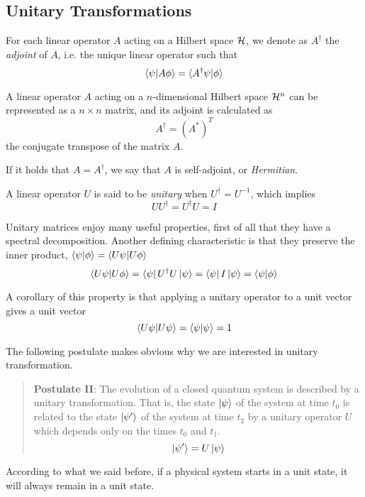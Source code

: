 \subsection{Unitary Transformations}

For each linear operator $A$ acting on a Hilbert space $\mathcal{H}$, we denote as $A^\dagger$ the \textit{adjoint} of $A$, i.e. the unique linear operator such that
\[
	\braket{\psi|A\phi} = \braket{A^\dagger\psi|\phi}
\]

A linear operator $A$ acting on a $n$-dimensional Hilbert space $\mathcal{H}^n$ can be represented as a $n\times n$ matrix, and its adjoint is calculated as 
\[
	A^\dagger = (A^*)^T
\] the conjugate transpose of the matrix $A$.


If it holds that $A = A^\dagger$, we say that $A$ is self-adjoint, or \textit{Hermitian}.

A linear operator $U$ is said to be \textit{unitary} when $U^\dagger = U^{-1}$, which implies 
\[
	UU^\dagger = U^\dagger U = I
\]

Unitary matrices enjoy many useful properties, first of all that they have a spectral decomposition. Another defining characteristic is that they preserve the inner product, $\braket{\psi | \phi} = \braket{U\psi | U\phi}$
\[
	\braket{U\psi | U\phi} = \bra{\psi}U^\dagger U\ket{\psi} = \bra{\psi}I\ket{\psi} = \braket{\psi|\phi}
\]

A corollary of this property is that applying a unitary operator to a unit vector gives a unit vector
\[
	\braket{U\psi | U\psi} = \braket{\psi|\psi} = 1
\]

The following postulate makes obvious why we are interested in unitary transformation.
\begin{quote}
\textbf{Postulate II}: The evolution of a closed quantum system is described by a unitary transformation. That is, the state $\ket{\psi}$ of the system at time $t_0$ is related to the state $\ket{\psi^\prime}$ of the system at time $t_2$ by a unitary operator $U$ which depends only on the times $t_0$ and $t_1$.
\[
	\ket{\psi^\prime} = U\ket{\psi}
\]
\end{quote}

According to what we said before, if a physical system starts in a unit state, it will always remain in a unit state.


